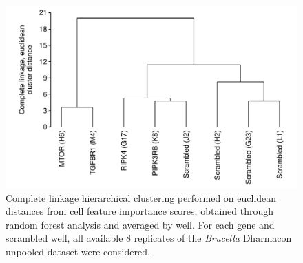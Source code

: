 \begin{knitrout}
\color{fgcolor}\begin{figure}

{\centering \includegraphics[width=.7\linewidth]{figures/R/forest-tree-forest-tree-1} 

}

\caption[Hierarchical clustering on averaged random forest importance scores of cellular features.]{Complete linkage hierarchical clustering performed on euclidean distances from cell feature importance scores, obtained through random forest analysis and averaged by well. For each gene and scrambled well, all available 8 replicates of the \textit{Brucella} Dharmacon unpooled dataset were considered.}\label{fig:forest-tree}
\end{figure}


\end{knitrout}

